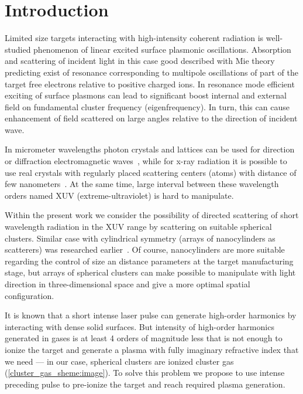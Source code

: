 \section{Introduction}

Limited size targets interacting with high-intensity coherent radiation is well-studied phenomenon of linear excited surface plasmonic oscillations. Absorption and scattering of incident light in this case good described with Mie theory predicting exist of resonance corresponding to multipole oscillations of part of the target free electrons relative to positive charged ions. In resonance mode efficient exciting of surface plasmons can lead to significant boost internal and external field on fundamental cluster frequency (eigenfrequency). In turn, this can cause enhancement of field scattered on large angles relative to the direction of incident wave. 

In micrometer wavelengths photon crystals and lattices can be used for direction or diffraction electromagnetic waves~\cite{lin_zhang}, while for x-ray radiation it is possible to use real crystals with regularly placed scattering centers (atoms) with distance of few nanometers~\cite{batterman_cole}. At the same time, large interval between these wavelength orders named XUV (extreme-ultraviolet) is hard to manipulate.

Within the present work we consider the possibility of directed scattering of short wavelength radiation in the XUV range by scattering on suitable spherical clusters. Similar case with cylindrical symmetry (arrays of nanocylinders as scatterers) was researched earlier~\cite{andreev_lecz}. Of course, nanocylinders are more suitable regarding the control of size an distance parameters at the target manufacturing stage, but arrays of spherical clusters can make possible to manipulate with light direction in three-dimensional space and give a more optimal spatial configuration.


It is known that a short intense laser pulse can generate high-order harmonics by interacting with dense solid surfaces. But intensity of high-order harmonics generated in gases is at least 4 orders of magnitude less that is not enough to ionize the target and generate a plasma with fully imaginary refractive index that we need --- in our case, spherical clusters are ionized cluster gas (\autoref{cluster_gas_sheme:image}). To solve this problem we propose to use intense preceding pulse to pre-ionize the target and reach required plasma generation.

